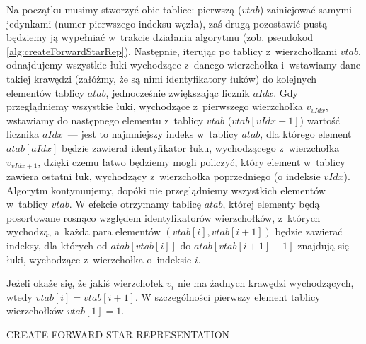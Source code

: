 Na początku musimy stworzyć obie tablice: pierwszą ($vtab$) zainicjować samymi jedynkami (numer pierwszego indeksu węzła), zaś drugą pozostawić pustą~---  będziemy ją wypełniać w~trakcie działania algorytmu (zob. pseudokod \ref{alg:createForwardStarRep}). Następnie, iterując po tablicy z~wierzchołkami $vtab$, odnajdujemy wszystkie łuki wychodzące z~danego wierzchołka i~wstawiamy dane takiej krawędzi (załóżmy, że są nimi identyfikatory łuków) do kolejnych elementów tablicy $atab$, jednocześnie zwiększając licznik $aIdx$. Gdy przeglądniemy wszystkie łuki, wychodzące z~pierwszego wierzchołka $v_{vIdx}$, wstawiamy do następnego elementu z~tablicy $vtab$ ($vtab \left[ vIdx+1 \right] $) wartość licznika $aIdx$~---  jest to najmniejszy indeks w~tablicy $atab$, dla którego element $atab \left[ aIdx \right] $ będzie zawierał identyfikator łuku, wychodzącego z~wierzchołka $v_{vIdx+1}$, dzięki czemu łatwo będziemy mogli policzyć, który element w~tablicy zawiera ostatni łuk, wychodzący z~wierzchołka poprzedniego (o indeksie $vIdx$). Algorytm kontynuujemy, dopóki nie przeglądniemy wszystkich elementów w~tablicy $vtab$. W efekcie otrzymamy tablicę $atab$, której elementy będą posortowane rosnąco względem identyfikatorów wierzchołków, z~których wychodzą, a~każda para elementów $ \left( vtab \left[ i \right] , vtab \left[ i+1 \right] \right) $ będzie zawierać indeksy, dla których od $atab \left[ vtab \left[ i \right] \right] $ do $atab \left[ vtab \left[ i+1 \right] -1 \right] $ znajdują się łuki, wychodzące z~wierzchołka o~indeksie $i$.

Jeżeli okaże się, że jakiś wierzchołek $v_{i}$ nie ma żadnych krawędzi wychodzących, wtedy $vtab \left[ i \right] = vtab \left[ i+1 \right] $. W szczególności pierwszy element tablicy wierzchołków $vtab \left[ 1 \right] = 1$.

\begin{pseudokod}[!htbp]
\DontPrintSemicolon
{}
\caption{CREATE-FORWARD-STAR-REPRESENTATION\label{alg:cfsr}}
\label{alg:createForwardStarRep}
\end{pseudokod}


